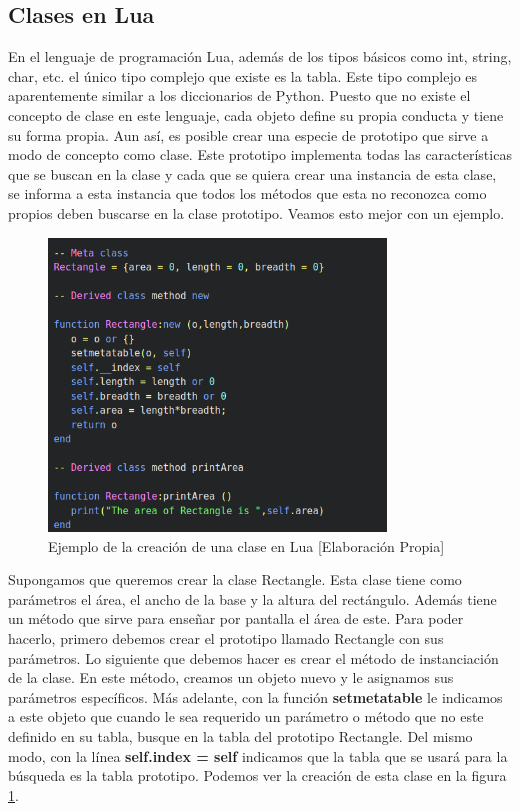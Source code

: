 \subsection*{Clases en Lua}

En el lenguaje de programación Lua, además de los tipos básicos como int, string, char, etc. el único tipo complejo que existe es la tabla. Este tipo complejo es aparentemente similar a los diccionarios de Python. Puesto que no existe el concepto de clase en este lenguaje, cada objeto define su propia conducta y tiene su forma propia. Aun así, es posible crear una especie de prototipo que sirve a modo de concepto como clase. Este prototipo implementa todas las características que se buscan en la clase y cada que se quiera crear una instancia de esta clase, se informa a esta instancia que todos los métodos que esta no reconozca como propios deben buscarse en la clase prototipo. Veamos esto mejor con un ejemplo.

\begin{figure}[ht]
    \centering
    \includegraphics[width=0.8\textwidth]{img/lua-clases.png}
    \caption{Ejemplo de la creación de una clase en Lua [Elaboración Propia]}
    \label{fig:lua-clases}
\end{figure}

Supongamos que queremos crear la clase Rectangle. Esta clase tiene como parámetros el área, el ancho de la base y la altura del rectángulo. Además tiene un método que sirve para enseñar por pantalla el área de este. Para poder hacerlo, primero debemos crear el prototipo llamado Rectangle con sus parámetros. Lo siguiente que debemos hacer es crear el método de instanciación de la clase. En este método, creamos un objeto nuevo y le asignamos sus parámetros específicos. Más adelante, con la función \textbf{setmetatable} le indicamos a este objeto que cuando le sea requerido un parámetro o método que no este definido en su tabla, busque en la tabla del prototipo Rectangle. Del mismo modo, con la línea \textbf{self.index = self} indicamos que la tabla que se usará para la búsqueda es la tabla prototipo. Podemos ver la creación de esta clase en la figura \ref {fig:lua-clases}.


